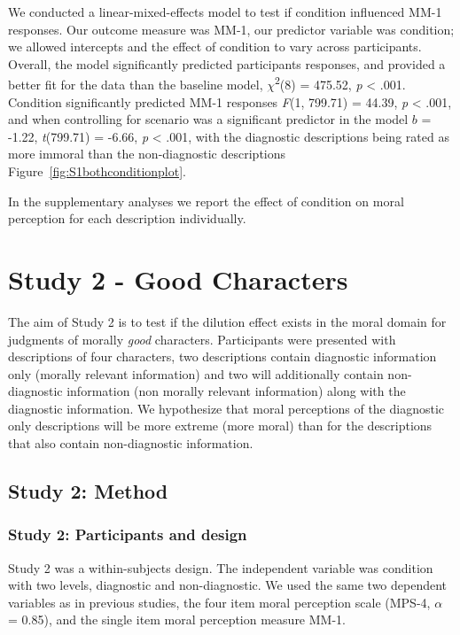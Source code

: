 \documentclass[
  man,floatsintext]{apa7}
\begin{document}
We conducted a linear-mixed-effects model to test if condition influenced MM-1 responses. Our outcome measure was MM-1, our predictor variable was condition; we allowed intercepts and the effect of condition to vary across participants. Overall, the model significantly predicted participants responses, and provided a better fit for the data than the baseline model, \(\chi\)\textsuperscript{2}(8) = 475.52, \emph{p} \textless{} .001. Condition significantly predicted MM-1 responses \emph{F}(1, 799.71) = 44.39, \emph{p} \textless{} .001, and when controlling for scenario was a significant predictor in the model \(b\) = -1.22, \emph{t}(799.71) = -6.66, \emph{p} \textless{} .001, with the diagnostic descriptions being rated as more immoral than the non-diagnostic descriptions Figure~\ref{fig:S1bothconditionplot}.

In the supplementary analyses we report the effect of condition on moral perception for each description individually.

\section{Study 2 - Good Characters}\label{study-2---good-characters}

The aim of Study 2 is to test if the dilution effect exists in the moral domain for judgments of morally \emph{good} characters. Participants were presented with descriptions of four characters, two descriptions contain diagnostic information only (morally relevant information) and two will additionally contain non-diagnostic information (non morally relevant information) along with the diagnostic information. We hypothesize that moral perceptions of the diagnostic only descriptions will be more extreme (more moral) than for the descriptions that also contain non-diagnostic information.

\subsection{Study 2: Method}\label{study-2-method}

\subsubsection{Study 2: Participants and design}\label{study-2-participants-and-design}

Study 2 was a within-subjects design. The independent variable was condition with two levels, diagnostic and non-diagnostic. We used the same two dependent variables as in previous studies, the four item moral perception scale (MPS-4, \(\alpha\) = 0.85), and the single item moral perception measure MM-1.
\end{document}
